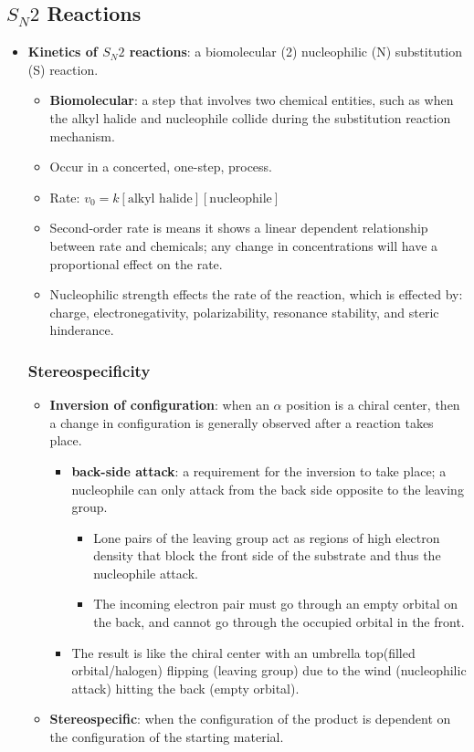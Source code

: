 \documentclass[12pt,a4paper]{article}
\begin{document}
\subsection{\texorpdfstring{\(S_N2\)}{Lg} Reactions}
\begin{itemize}
    \item \textbf{Kinetics of \(S_N2\) reactions}: a biomolecular (2) nucleophilic (N) substitution (S) reaction. 
        \begin{itemize}
            \item \textbf{Biomolecular}: a step that involves two chemical entities, such as when the alkyl halide and nucleophile collide during the substitution reaction mechanism. 
            \item Occur in a {\color{o-Sun}concerted}, one-step, process.
            \item Rate: \(v_0 = k[\text{alkyl halide}][\text{nucleophile}]\)
            \item Second-order rate is means it shows a linear dependent relationship between rate and chemicals; any change in concentrations will have a proportional effect on the rate.
            \item Nucleophilic strength effects the rate of the reaction, which is effected by: charge, electronegativity, polarizability, resonance stability, and steric hinderance.
        \end{itemize}
    \subsubsection{Stereospecificity}
        \begin{itemize}
            \item \textbf{Inversion of configuration}: when an $\alpha$ position is a chiral center, then a change in configuration is generally observed after a reaction takes place.
                \begin{itemize}
                    \item \textbf{back-side attack}: a requirement for the inversion to take place; a nucleophile can only attack from the back side opposite to the leaving group.
                        \begin{itemize}
                            \item Lone pairs of the leaving group act as regions of high electron density that block the front side of the substrate and thus the nucleophile attack.
                            \item The incoming electron pair must go through an empty orbital on the back, and cannot go through the occupied orbital in the front.
                        \end{itemize}
                    \item The result is like the chiral center with an umbrella top(filled orbital/halogen) flipping (leaving group) due to the wind (nucleophilic attack) hitting the back (empty orbital).
                \end{itemize}
            \item \textbf{Stereospecific}: when the configuration of the product is dependent on the configuration of the starting material.
        \end{itemize}

\end{itemize}
\end{document}

